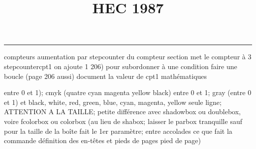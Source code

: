 \documentclass[11pt]{article}%
\title{\bf \vspace{-1cm} HEC 1987} %
\author{} %
\date{} %
\renewcommand{\headrulewidth}{0pt}%
\renewcommand{\footrulewidth}{0.4pt}%
\begin{document}
\maketitle %
\vspace{-1.2cm}\hrule %
\thispagestyle{fancy}

\vspace*{.4cm}


compteurs%
aumentation par stepcounter du compteur section%
met le compteur à 3%
stepcounter{cpt1} on ajoute 1%
206) pour subordonner à une condition %
faire une boucle (page 206 aussi) %
document la valeur de cpt1 
mathématiques\newcommand{\ch}{\operatorname{ch}} 
\newcommand{\sh}{\operatorname{sh}}
\renewcommand{\tanh}{\operatorname{th}}
\renewcommand{\sinh}{\operatorname{sh}}
\renewcommand{\cosh}{\operatorname{ch}}
\newcommand{\argsh}{\operatorname{argsh}}
\newcommand{\argch}{\operatorname{argch}}
\newcommand{\argth}{\operatorname{argth}}
\newcommand{\Id}{\operatorname{Id}}
\renewcommand{\leq}{\leq}
\renewcommand{\geq}{\geq }

\newcommand{\dlim}{\lim}
\newcommand{\dsum}{\sum}
\newcommand{\dprod}{\prod}



entre 0 et 1); cmyk (quatre cyan magenta yellow black) entre 0 et 1;
gray (entre 0 et 1) et black, white, red, green, blue, cyan, magenta,
yellow%
seule ligne; ATTENTION A LA TAILLE; petite différence avec shadowbox ou
doublebox, voire fcolorbox ou colorbox (au lieu de shabox; laisser le
parbox tranquille sauf pour la taille de la boîte
\newcommand{\Tbox}[1]{\begin{center} \shabox{\parbox{0.6
\linewidth}{#1}} \end{center}} %
fait le 1er paramètre; entre accolades ce que fait la commande
définition des en-têtes et pieds de pages\pagestyle{fancy}
\chead{}
\rfoot[ \ \thepage]{\thepage}
\cfoot{}
\lfoot{}
\thispagestyle{fancy} %
pied de page)\renewcommand{\footrulewidth}{0.4pt}
\renewcommand{\headrulewidth}{0.4pt}
\end{document}
